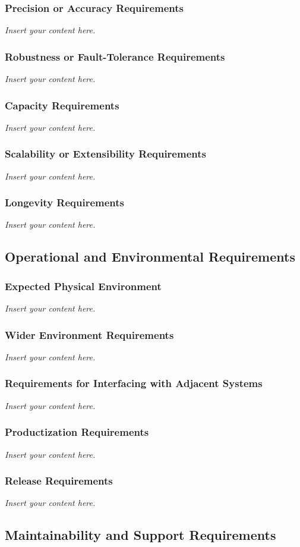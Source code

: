 \documentclass[12pt]{article}
\newcommand{\lips}{\textit{Insert your content here.}}
\begin{document}
\subsubsection{Precision or Accuracy Requirements}
\lips
\subsubsection{Robustness or Fault-Tolerance Requirements}
\lips
\subsubsection{Capacity Requirements}
\lips
\subsubsection{Scalability or Extensibility Requirements}
\lips
\subsubsection{Longevity Requirements}
\lips

\subsection{Operational and Environmental Requirements}
\subsubsection{Expected Physical Environment}
\lips
\subsubsection{Wider Environment Requirements}
\lips
\subsubsection{Requirements for Interfacing with Adjacent Systems}
\lips
\subsubsection{Productization Requirements}
\lips
\subsubsection{Release Requirements}
\lips

\subsection{Maintainability and Support Requirements}
\end{document}
